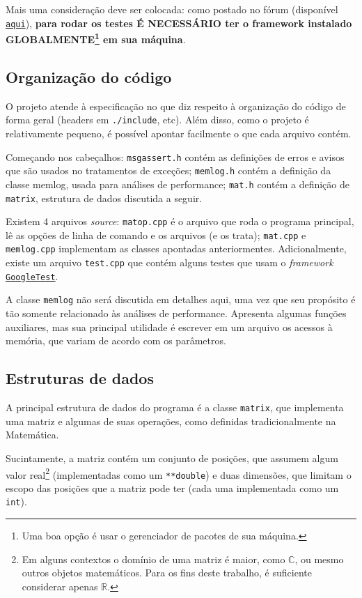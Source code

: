 \documentclass{article}
\def\code#1{\texttt{#1}}
\begin{document}
Mais uma consideração deve ser colocada: como postado no fórum (disponível \href{https://virtual.ufmg.br/20212/mod/forum/discuss.php?d=14488}{\nolinkurl{aqui}}), \textbf{para rodar os testes É NECESSÁRIO ter o framework instalado GLOBALMENTE\footnote{Uma boa opção é usar o gerenciador de pacotes de sua máquina.} em sua máquina}.

\subsection{Organização do código}
O projeto atende à especificação no que diz respeito à organização do código de forma geral (headers em \code{./include}, etc). Além disso, como o projeto é relativamente pequeno, é possível apontar facilmente o que cada arquivo contém. 

Começando nos cabeçalhos: \code{msgassert.h} contém as definições de erros e avisos que são usados no tratamentos de exceções; \code{memlog.h} contém a definição da classe memlog, usada para análises de performance; \code{mat.h} contém a definição de \code{matrix}, estrutura de dados discutida a seguir.

Existem 4 arquivos \textit{source}: \code{matop.cpp} é o arquivo que roda o programa principal, lê as opções de linha de comando e os arquivos (e os trata); \code{mat.cpp} e \code{memlog.cpp} implementam as classes apontadas anteriormentes. Adicionalmente, existe um arquivo \code{test.cpp} que contém alguns testes que usam o \textit{framework} \href{https://github.com/google/googletest}{\nolinkurl{GoogleTest}}.

A classe \code{memlog} não será discutida em detalhes aqui, uma vez que seu propósito é tão somente relacionado às análises de performance. Apresenta algumas funções auxiliares, mas sua principal utilidade é escrever em um arquivo os acessos à memória, que variam de acordo com os parâmetros.

\subsection{Estruturas de dados}
A principal estrutura de dados do programa é a classe \code{matrix}, que implementa uma matriz e algumas de suas operações, como definidas tradicionalmente na Matemática. 

Sucintamente, a matriz contém um conjunto de posições, que assumem algum valor real\footnote{Em alguns contextos o domínio de uma matriz é maior, como \( \mathbb{C} \), ou mesmo outros objetos matemáticos. Para os fins deste trabalho, é suficiente considerar apenas \( \mathbb{R} \).} (implementadas como um \code{**double}) e duas dimensões, que limitam o escopo das posições que a matriz pode ter (cada uma implementada como um \code{int}).
\end{document}
